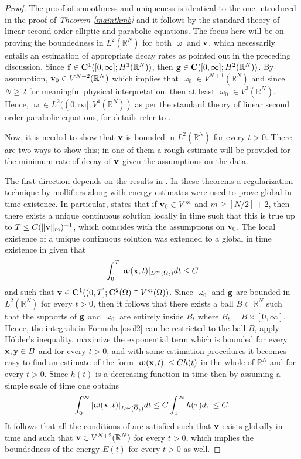 \documentclass[a4 paper, 11pt,twoside]{article}
\newcommand{\Bf}[1]{{\bf{#1}}}
\newcommand{\V}{{\bf{v}}}
\newcommand{\X}{{\bf{x}}}
\newcommand{\Y}{{\bf{y}}}
\newcommand{\0}{\Bf{0}}
\newcommand{\F}{{\bf{f}}}
\theoremstyle{definition}
\begin{document}
\begin{proof}
The proof of smoothness and uniqueness is identical to the one introduced in the proof of {\it Theorem \ref{mainthmb}} and it follows by the standard theory of linear second order elliptic and parabolic equations. The focus here will be on proving the boundedness in $L^2(\mathbb{R}^N)$ for both $\upomega$ and $\V$, which necessarily entails an estimation of appropriate decay rates as pointed out in the preceding discussion. Since $\F\in \Bf{C}^1([0,\infty];H^3(\mathbb{R}^N))$, then $\Bf{g}\in \Bf{C}([0,\infty]; {\color{black}H^2}(\mathbb{R}^N))$. {\color{black}By assumption}, $\V_0\in V^{N+2}(\mathbb{R}^N)$ which implies that $\upomega_0\in V^{N+1}(\mathbb{R}^N)$ and since $N\geq2$ for meaningful physical interpretation, then at least $\upomega_0\in V^3(\mathbb{R}^N)$. Hence, $\upomega\in L^2((0,\infty];V^4(\mathbb{R}^N))$ as per the standard theory of linear second order parabolic equations, for details refer to \cite[Theorem 6, p. 386]{evans}.

Now, it is needed to show that $\V$ is bounded in $L^2(\mathbb{R}^N)$ for every $t>0$. There are two ways to show this; in one of them a rough estimate will be provided for the minimum rate of decay of $\V$ given the assumptions on the data.

The first direction depends on the results in \cite[Theorems 3.4 and 3.6]{majda}. In these theorems a regularization technique by mollifiers along with energy estimates were used to prove global in time existence. In particular, \cite[Theorem 3.4]{majda} states that if $\V_0\in V^m$ and $m\geq[N/2]+2$, then there exists a unique continuous solution locally in time such that this is true up to $T\leq C(\|\V\|_m)^{-1}$, which coincides with the assumptions on $\V_0$. The local existence of a unique continuous solution was extended to a global in time existence in \cite[Theorem 3.6]{majda} given that
\[
\int_0^T|\upomega(\X,t)|_{L^\infty(\Omega_t)}dt\leq C
\]
and such that $\V\in \Bf{C}^1((0,T];\Bf{C}^2(\Omega)\cap V^m(\Omega))$. Since $\upomega_0$ and $\Bf{g}$ are bounded in $L^2(\mathbb{R}^N)$ for every $t>0$, then it follows that there exists a ball $B\subset\mathbb{R}^N$ such that the supports of $\Bf{g}$ and $\upomega_0$ are entirely inside $B_t$ where $B_t=B\times[0,\infty]$. Hence, the integrals in Formula \eqref{osol2} {\color{black}can be restricted} to the ball $B$, apply H\"older's inequality, maximize the exponential term which is bounded for every $\X,\Y\in B$ and for every $t>0$, and with some estimation procedures it becomes easy to find an estimate of the form $|\upomega(\X,t)|\leq C h(t)$ in the whole of $\mathbb{R}^N$ and for every $t>0$. Since $h(t)$ is a decreasing function in time then by assuming a simple scale of time one obtains
\[
\int_0^\infty|\upomega(\X,t)|_{L^\infty(\overline{\Omega}_t)}dt\leq C\int_1^\infty h(\tau)d\tau\leq C.
\]
It follows that all the conditions of \cite[Theorem 3.4, Theorem 3.6]{majda} are satisfied such that $\V$ exists globally in time and such that $\V\in V^{N+2}(\mathbb{R}^N)$ for every $t>0$, which implies the boundedness of the energy $E(t)$ for every $t>0$ as well.


\end{proof}
\end{document}
